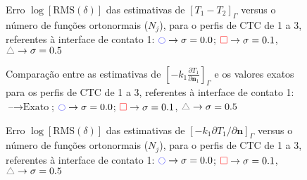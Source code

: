 \begin{figure}[h!b]
	\caption{Erro $\log[\text{RMS}(\delta)]$ das estimativas de $[T_1 - T_2]_\Gamma$ versus o número de funções ortonormais ($N_j$), para o perfis de CTC de 1 a 3, referentes à interface de contato 1: $\textcolor{blue}{\ocircle} \rightarrow \sigma = 0.0$; $\textcolor{red}{\square} \rightarrow \sigma = 0.1$, $\textcolor{gray}{\triangle} \rightarrow \sigma = 0.5$}
\end{figure}

\begin{figure}[h!b]
	\caption{Comparação entre as estimativas de $\left[-k_1 \frac{\partial T_1}{\partial\mathbf{n}_1}\right]_\Gamma$ e os valores exatos para os perfis de CTC de 1 a 3, referentes à interface de contato 1: $\text{--} \rightarrow \text{Exato}$; $\textcolor{blue}{\ocircle} \rightarrow \sigma = 0.0$; $\textcolor{red}{\square} \rightarrow \sigma = 0.1$, $\textcolor{gray}{\triangle} \rightarrow \sigma = 0.5$}
\end{figure}

\begin{figure}[h!b]
	\caption{Erro $\log[\text{RMS}(\delta)]$ das estimativas de $[-k_1 \partial T_1/\partial\mathbf{n}]_\Gamma$ versus o número de funções ortonormais ($N_j$), para o perfis de CTC de 1 a 3, referentes à interface de contato 1: $\textcolor{blue}{\ocircle} \rightarrow \sigma = 0.0$; $\textcolor{red}{\square} \rightarrow \sigma = 0.1$, $\textcolor{gray}{\triangle} \rightarrow \sigma = 0.5$}
\end{figure}

\begin{figure}[h!b]
\end{figure}

